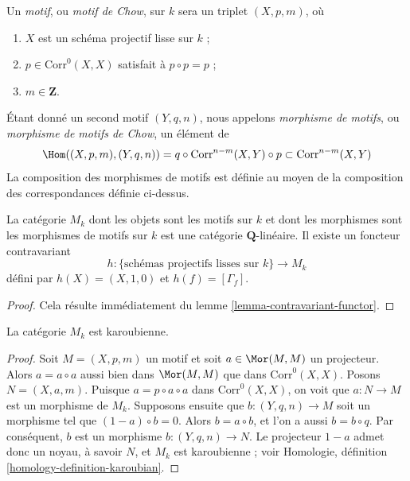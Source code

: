 \medskip\noindent
Un {\it motif}, ou {\it motif de Chow}, sur $k$ sera un triplet
$(X, p, m)$, où
\begin{enumerate}
\item $X$ est un schéma projectif lisse sur $k$ ;
\item $p \in \text{Corr}^0(X, X)$ satisfait à $p \circ p = p$ ;
\item $m \in \mathbf{Z}$.
\end{enumerate}
Étant donné un second motif $(Y, q, n)$, nous appelons
{\it morphisme de motifs}, ou {\it morphisme de motifs de Chow},
un élément de
$$
\Hom((X, p, m), (Y, q, n)) =
q \circ \text{Corr}^{n - m}(X, Y) \circ p \subset \text{Corr}^{n - m}(X, Y)
$$
La composition des morphismes de motifs est définie au moyen
de la composition des correspondances définie ci-dessus.

\begin{lemma}
\label{lemma-motives}
La catégorie $M_k$ dont les objets sont les motifs sur $k$ et dont les morphismes
sont les morphismes de motifs sur $k$ est une catégorie $\mathbf{Q}$-linéaire.
Il existe un foncteur contravariant
$$
h : \{\text{schémas projectifs lisses sur }k\} \longrightarrow M_k
$$
défini par $h(X) = (X, 1, 0)$ et $h(f) = [\Gamma_f]$.
\end{lemma}

\begin{proof}
Cela résulte immédiatement du lemme \ref{lemma-contravariant-functor}.
\end{proof}

\begin{lemma}
\label{lemma-Karoubian}
La catégorie $M_k$ est karoubienne.
\end{lemma}

\begin{proof}
Soit $M = (X, p, m)$ un motif et soit $a \in \Mor(M, M)$
un projecteur. Alors $a = a \circ a$ aussi bien dans $\Mor(M, M)$
que dans $\text{Corr}^0(X, X)$. Posons $N = (X, a, m)$.
Puisque $a = p \circ a \circ a$ dans $\text{Corr}^0(X, X)$,
on voit que $a : N \to M$ est un morphisme de $M_k$.
Supposons ensuite que $b : (Y, q, n) \to M$ soit un morphisme
tel que $(1 - a) \circ b = 0$. Alors $b = a \circ b$, et l'on a aussi
$b = b \circ q$. Par conséquent, $b$ est un morphisme $b : (Y, q, n) \to N$.
Le projecteur $1 - a$ admet donc un noyau, à savoir $N$,
et $M_k$ est karoubienne ; voir
Homologie, définition \ref{homology-definition-karoubian}.
\end{proof}


